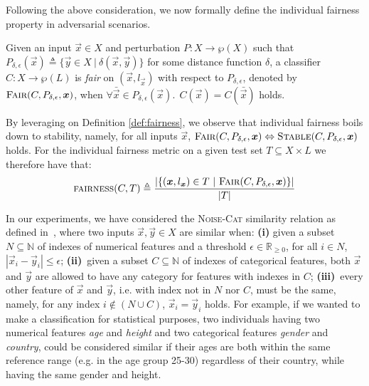 Following the above consideration, we now formally define the individual fairness property in adversarial scenarios.

\begin{definition}
	\label{def:fairness}
	Given an input $\vec{x} \in X$ and perturbation $P\colon X \rightarrow \wp(X)$ such that $P_{\delta, \epsilon}(\vec{x}) \triangleq \{\vec{y} \in X ~|~ \delta(\vec{x}, \vec{y})\}$ for some distance function $\delta$, a classifier $C: X \rightarrow \wp(L)$ is \emph{fair} on $(\vec{x}, l_{\vec{x}})$ with respect to $P_{\delta, \epsilon}$, denoted by $\textsc{Fair}(C, P_{\delta, \epsilon}, \vec{x})$, when $\forall \bar{\vec{x}} \in P_{\delta, \epsilon}(\vec{x}).\: ~ C(\vec{x}) = C(\bar{\vec{x}})$ holds.
\end{definition}

By leveraging on Definition \ref{def:fairness}, we observe that individual fairness boils down to stability, namely, for all inputs $\vec{x}$, $\textsc{Fair}(C, P_{\delta, \epsilon}, \vec{x}) \Leftrightarrow \textsc{Stable}(C, P_{\delta, \epsilon}, \vec{x})$ holds. For the individual fairness metric on a given test set $T \subseteq X \times L$ we therefore have that:
\begin{equation}\label{eq:fairness}
	\textsc{fairness}(C, T) \triangleq \frac{|\{(\vec{x}, l_{\vec{x}}) \in T ~|~ \textsc{Fair}(C, P_{\delta, \epsilon}, \vec{x})\}|}{|T|}
\end{equation}

In our experiments, we have considered the \textsc{Noise-Cat} similarity relation as defined in~\cite{ruoss2020learning}, where two inputs $\vec{x}, \vec{y} \in X$ are similar when: \textbf{(i)} given a subset $N \subseteq \mathbb{N}$ of indexes of numerical features and a threshold $\epsilon \in \mathbb{R}_{\geq 0}$, for all $i \in N$, $|\vec{x}_i - \vec{y}_i| \leq \epsilon$;
\textbf{(ii)}~given a subset $C \subseteq \mathbb{N}$ of indexes of categorical features, both $\vec{x}$ and $\vec{y}$ are allowed to have any category for features with indexes in $C$;
\textbf{(iii)}~every other feature of $\vec{x}$ and $\vec{y}$,
i.e. with index not in $N$ nor $C$, must be the same, namely, for any index
$i \not\in (N \cup C)$, $\vec{x}_i = \vec{y}_i$ holds.
For example, if we wanted to make a classification for statistical purposes, two individuals having two numerical features \emph{age} and \emph{height} and two categorical features \emph{gender} and \emph{country}, could be considered similar if their ages are both within the same reference range (e.g. in the age group 25-30) regardless of their country, while having the same gender and height.
